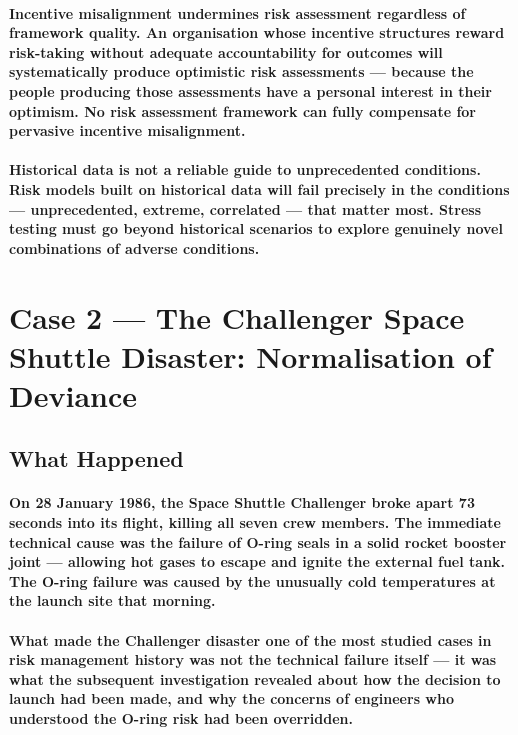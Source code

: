 \paragraph{\textbf{Incentive misalignment undermines risk assessment regardless of framework quality}. An organisation whose incentive structures reward risk-taking without adequate accountability for outcomes will systematically produce optimistic risk assessments — because the people producing those assessments have a personal interest in their optimism. No risk assessment framework can fully compensate for pervasive incentive misalignment.}
\paragraph{\textbf{Historical data is not a reliable guide to unprecedented conditions}. Risk models built on historical data will fail precisely in the conditions — unprecedented, extreme, correlated — that matter most. Stress testing must go beyond historical scenarios to explore genuinely novel combinations of adverse conditions.}

\section{Case 2 — The Challenger Space Shuttle Disaster: Normalisation of Deviance}

\subsection{What Happened}
\paragraph{On 28 January 1986, the Space Shuttle Challenger broke apart 73 seconds into its flight, killing all seven crew members. The immediate technical cause was the failure of O-ring seals in a solid rocket booster joint — allowing hot gases to escape and ignite the external fuel tank. The O-ring failure was caused by the unusually cold temperatures at the launch site that morning.}
\paragraph{What made the Challenger disaster one of the most studied cases in risk management history was not the technical failure itself — it was what the subsequent investigation revealed about how the decision to launch had been made, and why the concerns of engineers who understood the O-ring risk had been overridden.}

